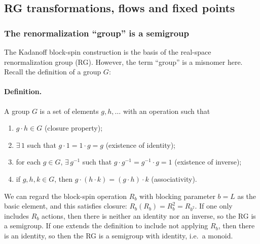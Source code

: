 

\subsection{RG transformations, flows and fixed points}
\subsubsection*{The renormalization ``group'' is a semigroup}

The Kadanoff block-spin construction is the basis of the real-space renormalization group (RG).
However, the term ``group'' is a misnomer here. Recall the definition of a group $G$:

\paragraph{Definition.} A group $G$ is a set of elements $g,h,\ldots$ with an operation such that
\begin{enumerate}[label=(\arabic*)]
  \item $g\cdot h\in G$ (closure property);
  \item $\exists\,1$ such that $g\cdot 1 = 1\cdot g = g$ (existence of identity);
  \item for each $g\in G$, $\exists\,g^{-1}$ such that $g\cdot g^{-1} = g^{-1}\cdot g = 1$ (existence of
    inverse);
  \item if $g,h,k\in G$, then $g\cdot(h\cdot k) = (g\cdot h)\cdot k$ (associativity).
\end{enumerate}
We can regard the block-spin operation $R_b$ with blocking parameter $b = L$ as the basic element, and
this satisfies closure: $R_b(R_b) = R_b^2 = R_{b^2}$. If one only includes $R_b$ actions, then there is
neither an identity nor an inverse, so the RG is a semigroup. If one extends the definition to include
not applying $R_b$, then there is an identity, so then the RG is a semigroup with identity, i.e.\ a
monoid.

